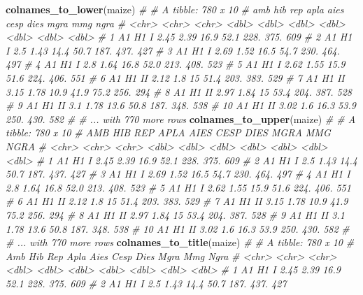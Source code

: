 \documentclass[
]{book}
\newenvironment{Shaded}{\begin{snugshade}}{\end{snugshade}}
\newcommand{\CommentTok}[1]{\textcolor[rgb]{0.56,0.35,0.01}{\textit{#1}}}
\newcommand{\KeywordTok}[1]{\textcolor[rgb]{0.13,0.29,0.53}{\textbf{#1}}}
\newcommand{\NormalTok}[1]{#1}
\begin{document}
\begin{Shaded}
\begin{Highlighting}[]
\KeywordTok{colnames_to_lower}\NormalTok{(maize)}
\CommentTok{# # A tibble: 780 x 10}
\CommentTok{#    amb   hib   rep    apla  aies  cesp  dies  mgra   mmg  ngra}
\CommentTok{#    <chr> <chr> <chr> <dbl> <dbl> <dbl> <dbl> <dbl> <dbl> <dbl>}
\CommentTok{#  1 A1    H1    I      2.45  2.39  16.9  52.1 228.   375.   609}
\CommentTok{#  2 A1    H1    I      2.5   1.43  14.4  50.7 187.   437.   427}
\CommentTok{#  3 A1    H1    I      2.69  1.52  16.5  54.7 230.   464.   497}
\CommentTok{#  4 A1    H1    I      2.8   1.64  16.8  52.0 213.   408.   523}
\CommentTok{#  5 A1    H1    I      2.62  1.55  15.9  51.6 224.   406.   551}
\CommentTok{#  6 A1    H1    II     2.12  1.8   15    51.4 203.   383.   529}
\CommentTok{#  7 A1    H1    II     3.15  1.78  10.9  41.9  75.2  256.   294}
\CommentTok{#  8 A1    H1    II     2.97  1.84  15    53.4 204.   387.   528}
\CommentTok{#  9 A1    H1    II     3.1   1.78  13.6  50.8 187.   348.   538}
\CommentTok{# 10 A1    H1    II     3.02  1.6   16.3  53.9 250.   430.   582}
\CommentTok{# # ... with 770 more rows}
\KeywordTok{colnames_to_upper}\NormalTok{(maize)}
\CommentTok{# # A tibble: 780 x 10}
\CommentTok{#    AMB   HIB   REP    APLA  AIES  CESP  DIES  MGRA   MMG  NGRA}
\CommentTok{#    <chr> <chr> <chr> <dbl> <dbl> <dbl> <dbl> <dbl> <dbl> <dbl>}
\CommentTok{#  1 A1    H1    I      2.45  2.39  16.9  52.1 228.   375.   609}
\CommentTok{#  2 A1    H1    I      2.5   1.43  14.4  50.7 187.   437.   427}
\CommentTok{#  3 A1    H1    I      2.69  1.52  16.5  54.7 230.   464.   497}
\CommentTok{#  4 A1    H1    I      2.8   1.64  16.8  52.0 213.   408.   523}
\CommentTok{#  5 A1    H1    I      2.62  1.55  15.9  51.6 224.   406.   551}
\CommentTok{#  6 A1    H1    II     2.12  1.8   15    51.4 203.   383.   529}
\CommentTok{#  7 A1    H1    II     3.15  1.78  10.9  41.9  75.2  256.   294}
\CommentTok{#  8 A1    H1    II     2.97  1.84  15    53.4 204.   387.   528}
\CommentTok{#  9 A1    H1    II     3.1   1.78  13.6  50.8 187.   348.   538}
\CommentTok{# 10 A1    H1    II     3.02  1.6   16.3  53.9 250.   430.   582}
\CommentTok{# # ... with 770 more rows}
\KeywordTok{colnames_to_title}\NormalTok{(maize)}
\CommentTok{# # A tibble: 780 x 10}
\CommentTok{#    Amb   Hib   Rep    Apla  Aies  Cesp  Dies  Mgra   Mmg  Ngra}
\CommentTok{#    <chr> <chr> <chr> <dbl> <dbl> <dbl> <dbl> <dbl> <dbl> <dbl>}
\CommentTok{#  1 A1    H1    I      2.45  2.39  16.9  52.1 228.   375.   609}
\CommentTok{#  2 A1    H1    I      2.5   1.43  14.4  50.7 187.   437.   427}

\end{Highlighting}
\end{Shaded}
\end{document}
